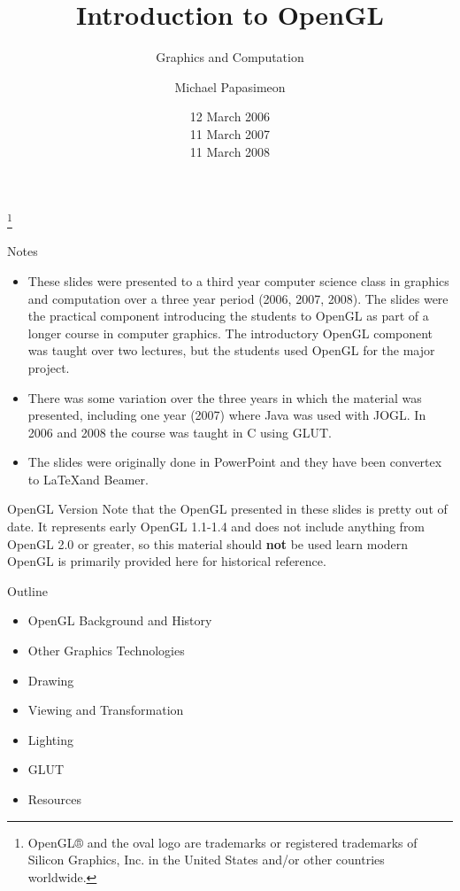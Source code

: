 \documentclass[aspectratio=1610,xcolor=dvipsnames,t]{beamer}
\title[Introduction to OpenGL]{Introduction to OpenGL \textregistered}
\subtitle{Graphics and Computation}
\author{Michael Papasimeon} %
\date[2006,2007,2008]{12 March 2006\\
      11 March 2007\\
      11 March 2008}
\begin{document}
\begin{frame}
    \titlepage
    \footnote{\tiny OpenGL® and the oval logo are trademarks or registered trademarks of Silicon Graphics, Inc. in the United States and/or other countries worldwide.} 
\end{frame} 

\begin{frame}{Notes}  
    \begin{itemize} 
    \item These slides were presented to a third year computer science class in
        graphics and computation over a three year period (2006, 2007, 2008). 
        The slides were the practical component introducing the students to
        OpenGL as part of a longer course in computer graphics. 
        The introductory OpenGL component was taught over two lectures, but
        the students used OpenGL for the major project. 
    \item There was some variation over the three years in which the material
        was presented, including one year (2007) where Java was used with JOGL.
        In 2006 and 2008 the course was taught in C using GLUT. 
    \item The slides were originally done in PowerPoint and they have been
        convertex to \LaTeX and Beamer. 
    \end{itemize} 
    \begin{alertblock}{OpenGL Version} 
        Note that the OpenGL presented in these slides is pretty out of date.
          It represents early OpenGL 1.1-1.4 and does not include anything from 
          OpenGL 2.0 or greater, so this material should \textbf{not} be used
          learn modern OpenGL is primarily provided here for historical
          reference. 
    \end{alertblock} 
\end{frame} 

\begin{frame}{Outline}
    \begin{itemize}
        \item OpenGL Background and History
        \item Other Graphics Technologies
        \item Drawing
        \item Viewing and Transformation
        \item Lighting
        \item GLUT 
        \item Resources
    \end{itemize} 
\end{frame}
\end{document}
